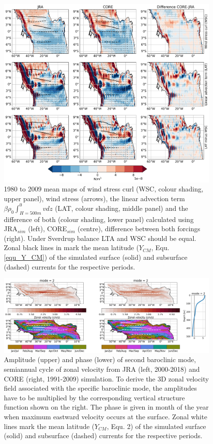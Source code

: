 \documentclass[os, manuscript]{copernicus}
\begin{document}
\clearpage
\begin{figure}[t]
	\includegraphics[width=12cm]{../../figures/paper/fA1_INALT20_linear_advection_maps_mean_1980_2009.png}
	\caption{1980 to 2009 mean maps of wind stress curl (WSC, colour shading, upper panel), wind stress (arrows), the linear advection term $\beta \rho_0 \int_{H=500m}^{0} v dz$ (LAT, colour shading, middle panel) and the difference of both (colour shading, lower panel)  calculated using JRA$_{sim}$ (left), CORE$_{sim}$ (centre), difference between both forcings (right). Under Sverdrup balance LTA and WSC should be equal. Zonal black lines in mark the mean latitude ($ Y_{CM} $, Equ. \ref{equ_Y_CM}) of the simulated surface (solid) and subsurface (dashed) currents for the respective periods.}
	\label{fig_lin_adv_term}
\end{figure}
\clearpage
\begin{figure}[t]
	\includegraphics[width=12cm]{../../figures/paper/fA2_INALT20_SH_MODE2.png}
	\caption{Amplitude (upper) and phase (lower) of second baroclinic mode, semiannual cycle of zonal velocity from JRA (left, 2000-2018) and CORE (right, 1991-2009) simulation. To derive the 3D zonal velocity field associated with the specific baroclinic mode, the amplitudes have to be multiplied by the corresponding vertical structure function shown on the right. The phase is given in month of the year when maximum eastward velocity occurs at the surface. Zonal white lines mark the mean latitude ($ Y_{CM} $, Equ. 2) of the simulated surface (solid) and subsurface (dashed) currents for the respective periods.}
	\label{fig_MODE2_SH}
\end{figure}
\end{document}
